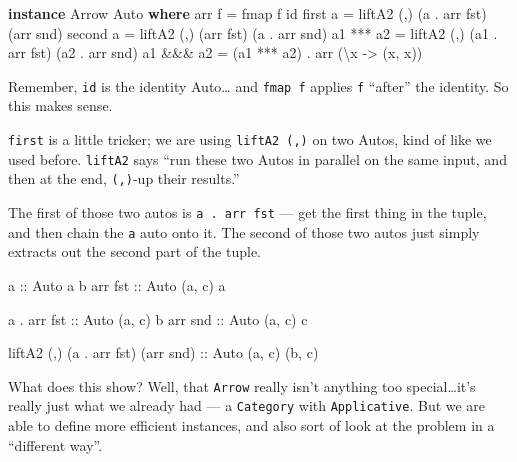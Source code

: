 \documentclass[]{article}
\newenvironment{Shaded}{}{}
\newcommand{\DataTypeTok}[1]{\textcolor[rgb]{0.56,0.13,0.00}{#1}}
\newcommand{\FunctionTok}[1]{\textcolor[rgb]{0.02,0.16,0.49}{#1}}
\newcommand{\KeywordTok}[1]{\textcolor[rgb]{0.00,0.44,0.13}{\textbf{#1}}}
\newcommand{\NormalTok}[1]{#1}
\newcommand{\OtherTok}[1]{\textcolor[rgb]{0.00,0.44,0.13}{#1}}
\begin{document}
\begin{Shaded}
\begin{Highlighting}[]
\KeywordTok{instance} \DataTypeTok{Arrow} \DataTypeTok{Auto} \KeywordTok{where}
\NormalTok{    arr f     }\FunctionTok{=}\NormalTok{ fmap f id}
\NormalTok{    first a   }\FunctionTok{=}\NormalTok{ liftA2 (,) (a  }\FunctionTok{.}\NormalTok{ arr fst) (arr snd)}
\NormalTok{    second a  }\FunctionTok{=}\NormalTok{ liftA2 (,) (arr fst)      (a  }\FunctionTok{.}\NormalTok{ arr snd)}
\NormalTok{    a1 }\FunctionTok{***}\NormalTok{ a2 }\FunctionTok{=}\NormalTok{ liftA2 (,) (a1 }\FunctionTok{.}\NormalTok{ arr fst) (a2 }\FunctionTok{.}\NormalTok{ arr snd)}
\NormalTok{    a1 }\FunctionTok{&&&}\NormalTok{ a2 }\FunctionTok{=}\NormalTok{ (a1 }\FunctionTok{***}\NormalTok{ a2) }\FunctionTok{.}\NormalTok{ arr (\textbackslash{}x }\OtherTok{->}\NormalTok{ (x, x))}
\end{Highlighting}
\end{Shaded}

Remember, \texttt{id} is the identity Auto\ldots{} and \texttt{fmap\ f} applies
\texttt{f} ``after'' the identity. So this makes sense.

\texttt{first} is a little tricker; we are using \texttt{liftA2\ (,)} on two
Autos, kind of like we used before. \texttt{liftA2} says ``run these two Autos
in parallel on the same input, and then at the end, \texttt{(,)}-up their
results.''

The first of those two autos is \texttt{a\ .\ arr\ fst} --- get the first thing
in the tuple, and then chain the \texttt{a} auto onto it. The second of those
two autos just simply extracts out the second part of the tuple.

\begin{Shaded}
\begin{Highlighting}[]
\OtherTok{a           ::} \DataTypeTok{Auto}\NormalTok{ a b}
\NormalTok{arr}\OtherTok{ fst     ::} \DataTypeTok{Auto}\NormalTok{ (a, c) a}

\NormalTok{a }\FunctionTok{.}\NormalTok{ arr}\OtherTok{ fst ::} \DataTypeTok{Auto}\NormalTok{ (a, c) b}
\NormalTok{arr}\OtherTok{ snd     ::} \DataTypeTok{Auto}\NormalTok{ (a, c) c}

\NormalTok{liftA2 (,) (a }\FunctionTok{.}\NormalTok{ arr fst) (arr snd)}\OtherTok{ ::} \DataTypeTok{Auto}\NormalTok{ (a, c) (b, c)}
\end{Highlighting}
\end{Shaded}

What does this show? Well, that \texttt{Arrow} really isn't anything too
special\ldots{}it's really just what we already had --- a \texttt{Category} with
\texttt{Applicative}. But we are able to define more efficient instances, and
also sort of look at the problem in a ``different way''.
\end{document}
